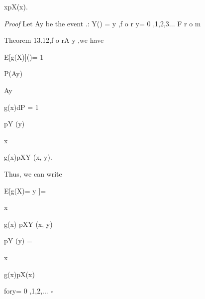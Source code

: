 xpX\vertY (x\verty).

\textit{Proof} Let Ay be the event .{: Y() = y },f o r y= 0 ,1,2,3... F r o m

Theorem 13.12,f o r\in A y ,we have

E[g(X)\vertY]()= 1

P(Ay)

\int

Ay

g(x)dP = 1

pY (y)

\sum

x

g(x)pXY (x, y).

Thus, we can write

E[g(X)\vertY= y ]=

\sum

x

g(x) pXY (x, y)

pY (y) =

\sum

x

g(x)pX\vertY (x\verty)

fory= 0 ,1,2,... \hfill $\square$
